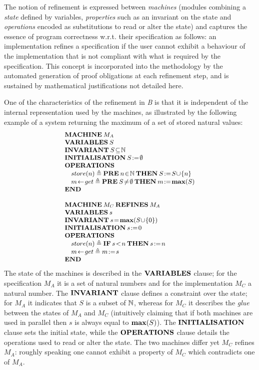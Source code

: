 \documentclass[conference]{IEEEtran}
\begin{document}
The notion of refinement is expressed between \emph{machines} (modules combining a
\emph{state} defined by variables, \emph{properties} such as an invariant on the state and
\emph{operations} encoded as substitutions to read or alter the state) and captures the
essence of program correctness w.r.t. their specification as follows: an implementation
refines a specification if the user cannot exhibit a behaviour of the implementation that is
not compliant with what is required by the specification. This concept is incorporated into
the methodology by the automated generation of proof obligations at each refinement step, and
is sustained by mathematical justifications not detailed here.

One of the characteristics of the refinement in \emph{B} is that it is independent of the 
internal representation used by the machines, as illustrated by the following example of a
system returning the maximum of a set of stored natural values:
\[\small\begin{array}{l}
\Cmd{MACHINE}\:M_A\\
\Cmd{VARIABLES}\:S\\
\Cmd{INVARIANT}\:S\!\subseteq\!\NAT\\
\Cmd{INITIALISATION}\:S\!:=\!\emptyset\\
\Cmd{OPERATIONS}\\
\quad
store(n)\triangleq\Cmd{PRE}\:n\!\in\!\NAT\:\Cmd{THEN}\:S\!:=\!S\!\cup\!\{n\}\\
\quad
m\!\gets\!get\triangleq\Cmd{PRE}\:S\!\not=\!\emptyset\:\Cmd{THEN}\:m\!:=\!\Cmd{max}(S)\\
\Cmd{END}
\\\\
\Cmd{MACHINE}\:M_C\:\Cmd{REFINES}\:M_A\\
\Cmd{VARIABLES}\:s\\
\Cmd{INVARIANT}\:s\!=\!\Cmd{max}(S\!\cup\!\{0\})\\
\Cmd{INITIALISATION}\:s\!:=\!0\\
\Cmd{OPERATIONS}\\
\quad
store(n)\triangleq\Cmd{IF}\:s\!<\!n\:\Cmd{THEN}\:s\!:=\!n\\
\quad
m\!\gets\!get\triangleq m\!:=\!s\\
\Cmd{END}
\end{array}\]
The state of the machines is described in the {\small$\mathbf{VARIABLES}$} clause; for the
specification {\small$M_A$} it is a set of natural numbers and for the implementation
{\small$M_C$} a natural number. The {\small$\mathbf{INVARIANT}$} clause defines a constraint over
the state; for {\small$M_A$} it indicates that {\small$S$} is a subset of {\small$\mathbb{N}$},
whereas for {\small$M_C$} it describes the \emph{glue} between the states of {\small$M_A$} and
{\small$M_C$} (intuitively claiming that if both machines are used in parallel then
{\small$s$} is always equal to {\small$\mathbf{max}(S)$}). The {\small$\mathbf{INITIALISATION}$}
clause sets the initial state, while the {\small$\mathbf{OPERATIONS}$} clause details the
operations used to read or alter the state. The two machines differ yet {\small$M_C$} refines
{\small$M_A$}: roughly speaking one cannot exhibit a property of {\small$M_C$} which
contradicts one of {\small$M_A$}.
\end{document}
